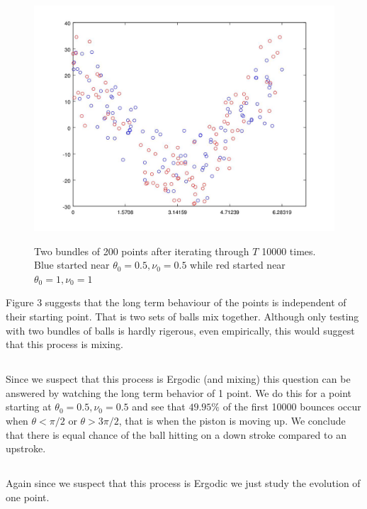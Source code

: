 \documentclass{unswmaths}
\begin{document}
\clearpage
\begin{figure}[h]
    \includegraphics[scale=0.5]{Question_6_Mixing}
    \label{qn_6_mixing}
    \caption{Two bundles of 200 points after iterating through  $ T $ 10000 times. Blue started near $ \theta_0 = 0.5, \nu_0 = 0.5 $ while red started near $ \theta_0 = 1, \nu_0 = 1 $ }
\end{figure}


Figure 3 suggests that the long term behaviour of the  points is independent of their starting point. That is two sets of balls mix together. Although only testing with two bundles of balls is hardly rigerous, even empirically, this would suggest that this process is mixing.
\subsection{}
Since we suspect that this process is Ergodic (and mixing) this question can be answered by watching the long term behavior of 1 point. We do this for a point starting at $ \theta_0 = 0.5, \nu_0 = 0.5 $ and see that $ 49.95 \% $ of the first 10000 bounces occur when $ \theta < \pi / 2 $ or $ \theta > 3\pi / 2 $, that is when the piston is moving up. We conclude that there is equal chance of the ball hitting on a down stroke compared to an upstroke.

\subsection{}
Again since we suspect that this process is Ergodic we just study the evolution of one point.
\end{document}
